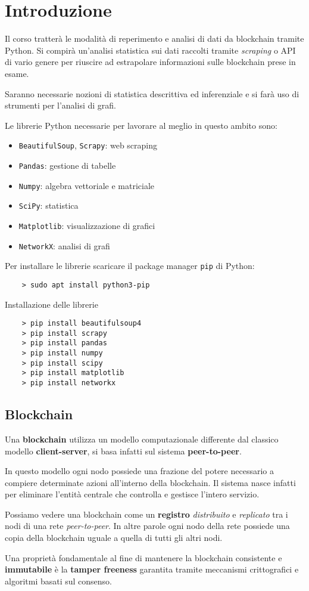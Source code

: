 \chapter{Introduzione}

Il corso tratterà le modalità di reperimento e analisi di dati da blockchain tramite Python. Si compirà un'analisi
statistica sui dati raccolti tramite \emph{scraping} o API di vario genere per riuscire ad estrapolare informazioni
sulle blockchain prese in esame.

Saranno necessarie nozioni di statistica descrittiva ed inferenziale e si farà uso di strumenti per l'analisi di
grafi.

Le librerie Python necessarie per lavorare al meglio in questo ambito sono:
\begin{itemize}
	\item \verb|BeautifulSoup|, \verb|Scrapy|: web scraping
	\item \verb|Pandas|: gestione di tabelle
	\item \verb|Numpy|: algebra vettoriale e matriciale
	\item \verb|SciPy|: statistica
	\item \verb|Matplotlib|: visualizzazione di grafici
	\item \verb|NetworkX|: analisi di grafi
\end{itemize}
Per installare le librerie scaricare il package manager \verb|pip| di Python:
\begin{verbatim}
	> sudo apt install python3-pip
\end{verbatim}
Installazione delle librerie
\begin{verbatim}
	> pip install beautifulsoup4
	> pip install scrapy
	> pip install pandas
	> pip install numpy
	> pip install scipy
	> pip install matplotlib
	> pip install networkx
\end{verbatim}

\section{Blockchain}
Una \textbf{blockchain} utilizza un modello computazionale differente dal classico modello \textbf{client-server},
si basa infatti sul sistema \textbf{peer-to-peer}.

In questo modello ogni nodo possiede una frazione del potere necessario a compiere determinate azioni all'interno
della blockchain. Il sistema nasce infatti per eliminare l'entità centrale che controlla e gestisce l'intero servizio.

Possiamo vedere una blockchain come un \textbf{registro} \emph{distribuito} e \emph{replicato} tra i nodi di una
rete \emph{peer-to-peer}. In altre parole ogni nodo della rete possiede una copia della blockchain uguale a quella
di tutti gli altri nodi.

Una proprietà fondamentale al fine di mantenere la blockchain consistente e \textbf{immutabile} è la
\textbf{tamper freeness} garantita tramite meccanismi crittografici e algoritmi basati sul consenso.

